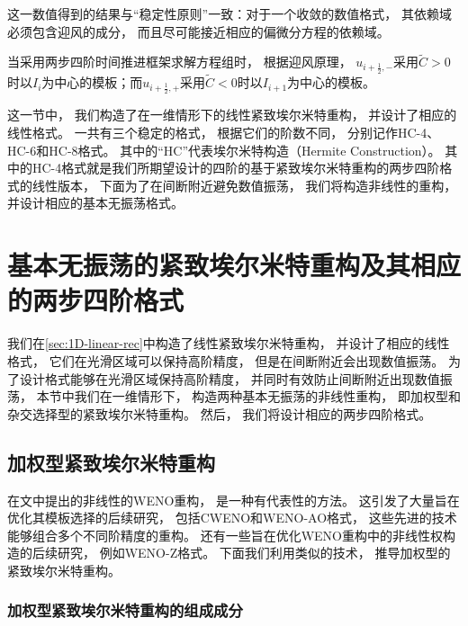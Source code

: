 \begin{remark}
  这一数值得到的结果与“稳定性原则”一致：对于一个收敛的数值格式，
  其依赖域必须包含迎风的成分，
  而且尽可能接近相应的偏微分方程的依赖域。
\end{remark}

\begin{remark}
  当采用两步四阶时间推进框架求解方程组时，
  根据迎风原理，
  $u_{i+\frac{1}{2},-}$采用$\widetilde{C}>0$时以$I_i$为中心的模板；而$u_{i+\frac{1}{2},+}$采用$\widetilde{C}<0$时以$I_{i+1}$为中心的模板。
\end{remark}

\vspace{\baselineskip} %
这一节中，
我们构造了在一维情形下的线性紧致埃尔米特重构，
并设计了相应的线性格式。
一共有三个稳定的格式，
根据它们的阶数不同，
分别记作HC-4、HC-6和HC-8格式。
其中的“HC”代表埃尔米特构造（Hermite Construction）。
其中的HC-4格式就是我们所期望设计的四阶的基于紧致埃尔米特重构的两步四阶格式的线性版本，
下面为了在间断附近避免数值振荡，
我们将构造非线性的重构，
并设计相应的基本无振荡格式。

\section{基本无振荡的紧致埃尔米特重构及其相应的两步四阶格式}

我们在\cref{sec:1D-linear-rec}中构造了线性紧致埃尔米特重构，
并设计了相应的线性格式，
它们在光滑区域可以保持高阶精度，
但是在间断附近会出现数值振荡。
为了设计格式能够在光滑区域保持高阶精度，
并同时有效防止间断附近出现数值振荡，
本节中我们在一维情形下，
构造两种基本无振荡的非线性重构，
即加权型和杂交选择型的紧致埃尔米特重构。
然后，
我们将设计相应的两步四阶格式。

\subsection{加权型紧致埃尔米特重构}
\label{sec:1D-WHC}

在文\cite{WENO-1996}中提出的非线性的WENO重构，
是一种有代表性的方法。
这引发了大量旨在优化其模板选择的后续研究，
包括CWENO和WENO-AO格式，
这些先进的技术能够组合多个不同阶精度的重构。
还有一些旨在优化WENO重构中的非线性权构造的后续研究，
例如WENO-Z格式。
下面我们利用类似的技术，
推导加权型的紧致埃尔米特重构。

\subsubsection{加权型紧致埃尔米特重构的组成成分}

